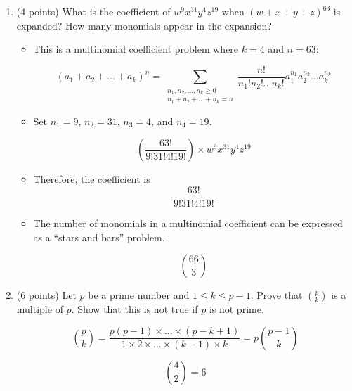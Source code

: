 \documentclass[11pt]{article}
\begin{document}
\begin{enumerate}
\begin{itemize}
\end{itemize}



\item (4 points) What is the coefficient of $w^{9}x^{31}y^{4}z^{19}$ when $(w + x + y + z)^{63}$ is expanded? How
many monomials appear in the expansion?

\begin{itemize}

\item This is a multinomial coefficient problem where $k = 4$ and $n = 63$:

\begin{equation*}
(a_1+a_2+...+a_k)^n=\sum_{\substack{n_1,n_2,...,n_k\ge 0 \\ 
n_1+n_2+...+n_k=n}}\frac{n!}{n_1!n_2!...n_k!}a_1^{n_1}a_2^{n_2}...a_k^{n_k}
\end{equation*}

\item Set $n_1 = 9$, $n_2 =31$, $n_3 = 4$, and $n_4 = 19$.

\begin{equation*}
\left(\frac{63!}{9!31!4!19!}\right)\times w^{9}x^{31}y^{4}z^{19}
\end{equation*}


\item Therefore, the coefficient is
\begin{equation*}
\frac{63!}{9!31!4!19!}
\end{equation*}

\item The number of monomials in a multinomial coefficient can be expressed as a ``stars and bars'' problem.

\begin{equation*}
66 \choose 3
\end{equation*}

\end{itemize}



\item (6 points) Let $p$ be a prime number and $1 \le k \le p - 1$. Prove that $p \choose k$ is a multiple of $p$.
Show that this is not true if $p$ is not prime.

\begin{equation*}
{p\choose k} = \frac{p(p-1) \times ... \times (p - k + 1)}{1 \times 2 \times ... \times (k - 1) \times k} = p{p - 1 \choose k}
\end{equation*}

\begin{equation*}
{4\choose 2} = 6
\end{equation*}


\end{enumerate}
\end{document}

